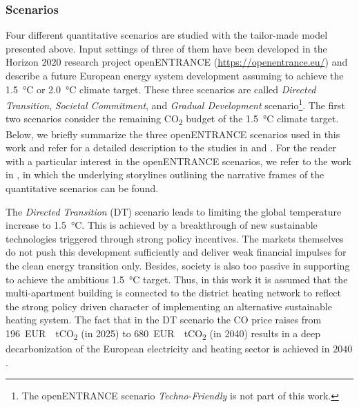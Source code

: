 \subsubsection{Scenarios}\label{sec:scenarios}
Four different quantitative scenarios are studied with the tailor-made model presented above. Input settings of three of them have been developed in the Horizon $2020$ research project openENTRANCE (\url{https://openentrance.eu/}) and describe a future European energy system development assuming to achieve the \SI{1.5}{\degreeCelsius} or \SI{2.0}{\degreeCelsius} climate target. These three scenarios are called \textit{Directed Transition}, \textit{Societal Commitment}, and \textit{Gradual Development} scenario\footnote{The openENTRANCE scenario \textit{Techno-Friendly} is not part of this work.}. The first two scenarios consider the remaining CO\textsubscript{2} budget of the \SI{1.5}{\degreeCelsius} climate target. Below, we briefly summarize the three openENTRANCE scenarios used in this work and refer for a detailed description to the studies in \cite{auer2020development} and \cite{auer2020quantitative}. For the reader with a particular interest in the openENTRANCE scenarios, we refer to the work in \cite{auer2019quantitative}, in which the underlying storylines outlining the narrative frames
of the quantitative scenarios can be found.\vspace{0.5cm}

The \textit{Directed Transition} (DT) scenario leads to limiting the global temperature increase to \SI{1.5}{\degreeCelsius}. This is achieved by a breakthrough of new sustainable technologies triggered through strong policy incentives. The markets themselves do not push this development sufficiently and deliver weak financial impulses for the clean energy transition only. Besides, society is also too passive in supporting to achieve the ambitious \SI{1.5}{\degreeCelsius} target. Thus, in this work it is assumed that the multi-apartment building is connected to the district heating network to reflect the strong policy driven character of implementing an alternative sustainable heating system. The fact that in the DT scenario the CO price raises from \SI{196}{EUR \per tCO_{2}} (in 2025) to \SI{680}{EUR \per tCO_{2}} (in 2040) results in a deep decarbonization of the European electricity and heating sector is achieved in $2040$.\vspace{0.5cm}


